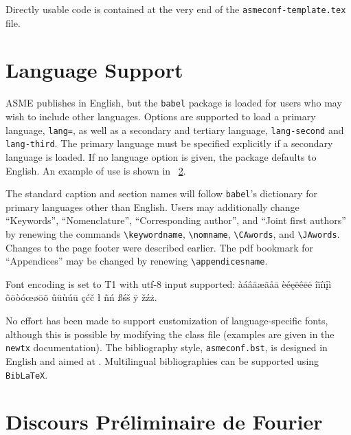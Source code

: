 \documentclass[varvw,largesc,upint,mathalfa=cal=euler,hyphenate,balance,lang-second=french,lang=english,colorlinks]{asmeconf} %
\begin{document}
Directly usable code is contained at the very end of the \texttt{asmeconf-template.tex} file.



\section{Language Support}\label{appendix:c}

ASME publishes in English, but the \texttt{babel} package is loaded for 
users who may wish to include other languages. Options are supported to load a primary language, \texttt{lang=}, 
as well as a secondary and tertiary language, \texttt{lang-second} and \texttt{lang-third}.  
The primary language must be specified explicitly if a secondary language is loaded.  
If no language option is given, the package defaults to English.  An example of use is 
shown in \appendixname\ \ref{app:fourier}.

The standard caption and section names will follow \texttt{babel}'s dictionary for primary languages other than English.  Users may additionally change ``Keywords'', ``Nomenclature'',  ``Corresponding author'', and ``Joint first authors'' by renewing the commands \verb|\keywordname|, \verb|\nomname|, \verb|\CAwords|, and \verb|\JAwords|. Changes to the page footer were described earlier. The pdf bookmark for ``Appendices'' may be changed by renewing \verb|\appendicesname|.

Font encoding is set to T1 with utf-8 input supported: 
àáâäæãåā  èéęëêēė  îïíīįì ôöòóœøōõ ûüùúū çćč ł ñń ßśš ÿ žźż.

No effort has been made to support customization of language-specific fonts, although this is possible by modifying the class file (examples are given in the \texttt{newtx} documentation). The bibliography style, \texttt{asmeconf.bst}, is designed in English and aimed at .  Multilingual bibliographies can be supported using \texttt{BibLaTeX}.

\section{Discours Préliminaire de Fourier}\label{app:fourier}
\end{document}
